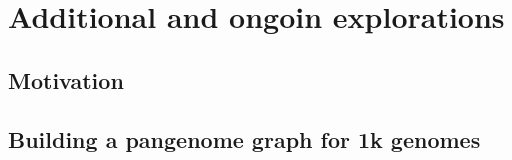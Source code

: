 \chapter{Additional and ongoin explorations}
\label{sec:explorations}

\section{Motivation}

\section{Building a pangenome graph for 1k genomes}

